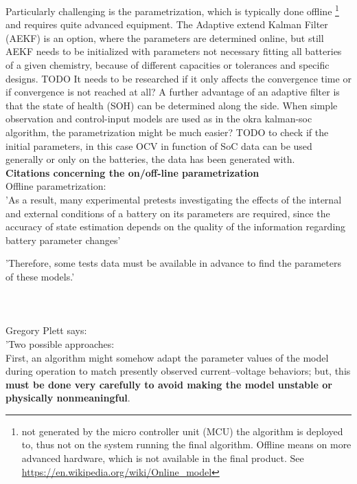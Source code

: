 Particularly challenging is the parametrization, which is typically done offline \footnote{not generated by the micro controller unit (MCU) the algorithm is deployed to, thus not on the system running the final algorithm. Offline means on more advanced hardware, which is not available in the final product. See \url{https://en.wikipedia.org/wiki/Online_model} } and requires quite advanced equipment. The Adaptive extend Kalman Filter (AEKF) is an option, where the parameters are determined online, but still AEKF needs to be initialized with parameters not necessary fitting all batteries of a given chemistry, because of different capacities or tolerances and specific designs. 
TODO It needs to be researched if it only affects the convergence time or if convergence is not reached at all? A further advantage of an adaptive filter is that the state of health (SOH) can be determined along the side. 
When simple observation and control-input models are used as in the okra kalman-soc algorithm, the parametrization might be much easier?
TODO to check if the initial parameters, in this case OCV in function of SoC data can be used generally or only on the batteries, the data has been generated with. \\

\textbf{Citations concerning the on/off-line parametrization} \\

Offline parametrization: \\
'As a result, many experimental pretests investigating the
effects of the internal and external conditions of a battery on its parameters are required, since the
accuracy of state estimation depends on the quality of the information regarding battery parameter
changes'

'Therefore, some tests data must be available in 
advance to find the parameters of these models.'
\cite{hussein2011overview}  \\ \\ \\ \\

Gregory Plett says: \\
'Two possible approaches: \\

First, an algorithm might somehow adapt the parameter values of the model during operation to match presently observed current–voltage behaviors; but, this \textbf{must be done very carefully to avoid making the model unstable or physically nonmeaningful}. \\


